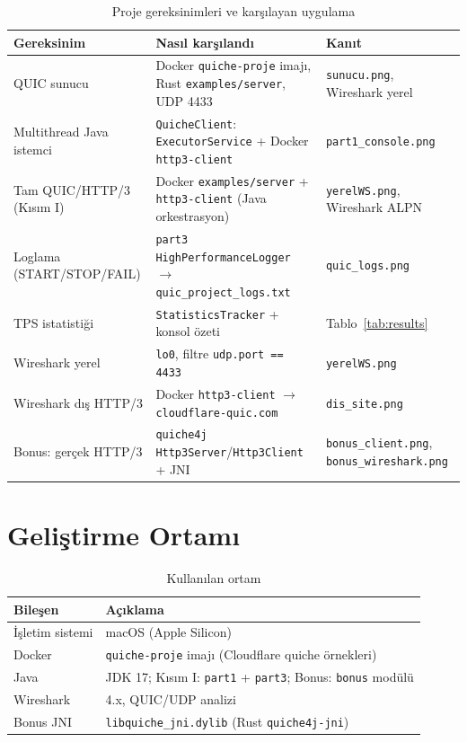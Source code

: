 \documentclass[12pt,a4paper]{article}
\begin{document}
\begin{table}[H]
  \centering
  \caption{Proje gereksinimleri ve karşılayan uygulama}
  \label{tab:requirements}
  \begin{tabular}{p{4.2cm}p{4.5cm}p{4.5cm}}
    \toprule
    \textbf{Gereksinim} & \textbf{Nasıl karşılandı} & \textbf{Kanıt} \\
    \midrule
    QUIC sunucu & Docker \texttt{quiche-proje} imajı, Rust \texttt{examples/server}, UDP 4433 &
    \texttt{sunucu.png}, Wireshark yerel \\
    Multithread Java istemci & \texttt{QuicheClient}: \texttt{ExecutorService} + Docker \texttt{http3-client} &
    \texttt{part1\_console.png} \\
    Tam QUIC/HTTP/3 (Kısım I) & Docker \texttt{examples/server} + \texttt{http3-client} (Java orkestrasyon) &
    \texttt{yerelWS.png}, Wireshark ALPN \\
    Loglama (START/STOP/FAIL) & \texttt{part3} \texttt{HighPerformanceLogger} $\rightarrow$ \texttt{quic\_project\_logs.txt} &
    \texttt{quic\_logs.png} \\
    TPS istatistiği & \texttt{StatisticsTracker} + konsol özeti &
    Tablo~\ref{tab:results} \\
    Wireshark yerel & \texttt{lo0}, filtre \texttt{udp.port == 4433} &
    \texttt{yerelWS.png} \\
    Wireshark dış HTTP/3 & Docker \texttt{http3-client} $\rightarrow$ \texttt{cloudflare-quic.com} &
    \texttt{dis\_site.png} \\
    Bonus: gerçek HTTP/3 & \texttt{quiche4j} \texttt{Http3Server}/\texttt{Http3Client} + JNI &
    \texttt{bonus\_client.png}, \texttt{bonus\_wireshark.png} \\
    \bottomrule
  \end{tabular}
\end{table}

\section{Geliştirme Ortamı}

\begin{table}[H]
  \centering
  \caption{Kullanılan ortam}
  \begin{tabular}{ll}
    \toprule
    \textbf{Bileşen} & \textbf{Açıklama} \\
    \midrule
    İşletim sistemi & macOS (Apple Silicon) \\
    Docker & \texttt{quiche-proje} imajı (Cloudflare quiche örnekleri) \\
    Java & JDK 17; Kısım I: \texttt{part1} + \texttt{part3}; Bonus: \texttt{bonus} modülü \\
    Wireshark & 4.x, QUIC/UDP analizi \\
    Bonus JNI & \texttt{libquiche\_jni.dylib} (Rust \texttt{quiche4j-jni}) \\
    \bottomrule
  \end{tabular}
\end{table}
\end{document}

